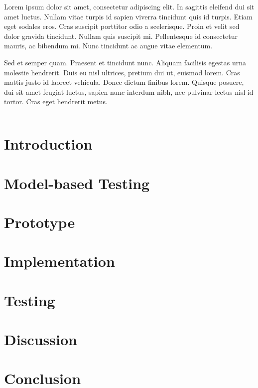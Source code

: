 \documentclass[a4paper, 12pt,titlepage]{dithesis}
\begin{document}

\sisluettelo

Lorem ipsum dolor sit amet, consectetur adipiscing elit. In sagittis eleifend dui sit amet luctus. Nullam vitae turpis id sapien viverra tincidunt quis id turpis. Etiam eget sodales eros. Cras suscipit porttitor odio a scelerisque. Proin et velit sed dolor gravida tincidunt. Nullam quis suscipit mi. Pellentesque id consectetur mauris, ac bibendum mi. Nunc tincidunt ac augue vitae elementum.

Sed et semper quam. Praesent et tincidunt nunc. Aliquam facilisis egestas urna molestie hendrerit. Duis eu nisl ultrices, pretium dui ut, euismod lorem. Cras mattis justo id laoreet vehicula. Donec dictum finibus lorem. Quisque posuere, dui sit amet feugiat luctus, sapien nunc interdum nibh, nec pulvinar lectus nisl id tortor. Cras eget hendrerit metus.


\setlongtables
\begin{longtable}[l]{p{3cm}p{}}



\end{longtable}
\setcounter{table}{0}

\chapter{Introduction}
\sivunumerot
\thispagestyle{empty}

\chapter{Model-based Testing}


\chapter{Prototype}

\chapter{Implementation}

\chapter{Testing}

\chapter{Discussion}

\chapter{Conclusion}



\end{document}

